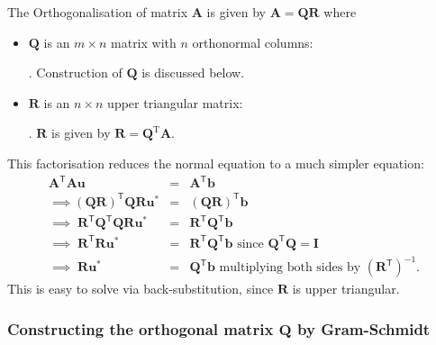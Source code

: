 The  Orthogonalisation of matrix $\mathbf A$ is given by $\mathbf A = \mathbf {QR}$ where
\begin{itemize}
\item $\mathbf{Q}$ is an $m\times n$ matrix with $n$ orthonormal columns:
.  Construction of $\mathbf Q$ is discussed below.

\item $\mathbf{R }$ is an $n\times n$ upper triangular matrix:
.  $\mathbf R$ is given by $\mathbf R = \mathbf Q^\mathrm T \mathbf A$.

\end{itemize}


 This factorisation  reduces the normal equation  to a much simpler equation:
\begin{eqnarray*}
\mathbf{A}^\mathsf{T}\mathbf{A}\mathbf{u}&=&\mathbf{A}^\mathsf{T}\mathbf{b}\\
\implies (\mathbf{Q}\mathbf{R})^\mathsf{T}\mathbf{Q}\mathbf{R}\mathbf{u}^\ast &=& (\mathbf{Q}\mathbf{R})^\mathsf{T}\mathbf{b} \\
{\implies}\; \mathbf{R}^\mathsf{T}\mathbf{Q}^\mathsf{T}\mathbf{Q}\mathbf{R}\mathbf{u}^\ast &=&
\mathbf{R}^\mathsf{T}\mathbf{Q}^\mathsf{T}\mathbf{b}
\\
{\implies}\; 
 \mathbf{R}^\mathsf{T} \mathbf{R}\mathbf{u}^\ast &=& \mathbf{R}^\mathsf{T}\mathbf{Q}^\mathsf{T}\mathbf{b} \mbox{ since $\mathbf Q^\mathsf{T}\mathbf Q = \mathbf I $}\\
 {\implies}\; \mathbf{R}\mathbf{u}^\ast  &=& \mathbf{Q}^\mathsf{T}\mathbf{b} \mbox{ multiplying both sides by } (\mathbf{R}^\mathsf{T})^{-1}.
 \end{eqnarray*}
This is easy to solve via back-substitution, since $\mathbf R$ is upper triangular.


\subsubsection{Constructing  the orthogonal matrix $\mathbf Q$ by Gram-Schmidt}

